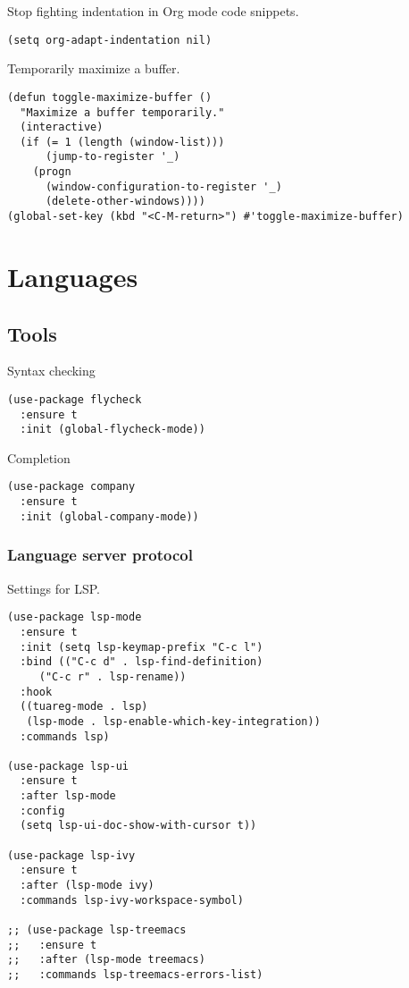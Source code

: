 \documentclass[a4paper,11pt]{article}
\begin{document}
Stop fighting indentation in Org mode code snippets.
\begin{verbatim}
(setq org-adapt-indentation nil)
\end{verbatim}

Temporarily maximize a buffer.
\begin{verbatim}
(defun toggle-maximize-buffer ()
  "Maximize a buffer temporarily."
  (interactive)
  (if (= 1 (length (window-list)))
      (jump-to-register '_)
    (progn
      (window-configuration-to-register '_)
      (delete-other-windows))))
(global-set-key (kbd "<C-M-return>") #'toggle-maximize-buffer)
\end{verbatim}

\section{Languages}
\label{sec:orgf08e45f}
\subsection{Tools}
\label{sec:org7fa1523}
Syntax checking
\begin{verbatim}
(use-package flycheck
  :ensure t
  :init (global-flycheck-mode))
\end{verbatim}

Completion
\begin{verbatim}
(use-package company
  :ensure t
  :init (global-company-mode))
\end{verbatim}

\subsubsection{Language server protocol}
\label{sec:orge1caf1a}
Settings for LSP.
\begin{verbatim}
(use-package lsp-mode
  :ensure t
  :init (setq lsp-keymap-prefix "C-c l")
  :bind (("C-c d" . lsp-find-definition)
	 ("C-c r" . lsp-rename))
  :hook
  ((tuareg-mode . lsp)
   (lsp-mode . lsp-enable-which-key-integration))
  :commands lsp)

(use-package lsp-ui
  :ensure t
  :after lsp-mode
  :config
  (setq lsp-ui-doc-show-with-cursor t))

(use-package lsp-ivy
  :ensure t
  :after (lsp-mode ivy)
  :commands lsp-ivy-workspace-symbol)

;; (use-package lsp-treemacs
;;   :ensure t
;;   :after (lsp-mode treemacs)
;;   :commands lsp-treemacs-errors-list)
\end{verbatim}
\end{document}
